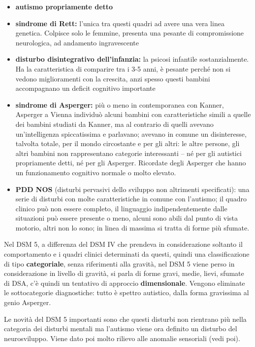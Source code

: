 \begin{itemize}
\item
  \textbf{autismo propriamente detto}
\item
  \textbf{sindrome di Rett:} l'unica tra questi quadri ad avere una vera
  linea genetica. Colpisce solo le femmine, presenta una pesante di
  compromissione neurologica, ad andamento ingravescente
\item
  \textbf{disturbo disintegrativo dell'infanzia:} la psicosi infantile
  sostanzialmente. Ha la caratteristica di comparire tra i 3-5 anni, è
  pesante perché non si vedono miglioramenti con la crescita, anzi
  spesso questi bambini accompagnano un deficit cognitivo importante
\item
  \textbf{sindrome di Asperger:} più o meno in contemporanea con Kanner,
  Asperger a Vienna individuò alcuni bambini con caratteristiche simili
  a quelle dei bambini studiati da Kanner, ma al contrario di quelli
  avevano un'intelligenza spiccatissima e parlavano; avevano in comune
  un disinteresse, talvolta totale, per il mondo circostante e per gli
  altri: le altre persone, gli altri bambini non rappresentano categorie
  interessanti -- né per gli autistici propriamente detti, né per gli
  Asperger. Ricordate degli Asperger che hanno un funzionamento
  cognitivo normale o molto elevato.
\item
  \textbf{PDD NOS} (disturbi pervasivi dello sviluppo non altrimenti
  specificati): una serie di disturbi con molte caratteristiche in
  comune con l'autismo; il quadro clinico può non essere completo, il
  linguaggio indipendentemente dalle situazioni può essere presente o
  meno, alcuni sono abili dal punto di vista motorio, altri non lo sono;
  in linea di massima si tratta di forme più sfumate.
\end{itemize}

Nel DSM 5, a differenza del DSM IV che prendeva in considerazione
soltanto il comportamento e i quadri clinici determinati da questi,
quindi una classificazione di tipo \textbf{categoriale}, senza
riferimenti alla gravità, nel DSM 5 viene perso in considerazione in
livello di gravità, si parla di forme gravi, medie, lievi, sfumate di
DSA, c'è quindi un tentativo di approccio \textbf{dimensionale}. Vengono
eliminate le sottocategorie diagnostiche: tutto è spettro autistico,
dalla forma gravissima al genio Asperger.

Le novità del DSM 5 importanti sono che questi disturbi non rientrano
più nella categoria dei disturbi mentali ma l'autismo viene ora definito
un disturbo del neurosviluppo. Viene dato poi molto rilievo alle
anomalie sensoriali (vedi poi).

